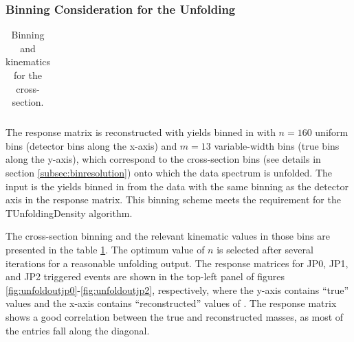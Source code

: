 \subsubsection{Binning Consideration for the Unfolding}

\begin{table}
    \centering
    \begin{tabular}{cccccc}
    \hline
    
    \end{tabular}
    \caption{Binning and kinematics for the \dipion cross-section.}
    \label{tab:xseckin}
\end{table}

 The response matrix is reconstructed with \dipion yields binned in \minv with $n = 160$ uniform bins (detector bins along the x-axis) and $m = 13$ variable-width bins (true bins along the y-axis), which correspond to the cross-section bins (see details in section \ref{subsec:binresolution}) onto which the data spectrum is unfolded. The input is the \dipion yields binned in \minv from the data with the same binning as the detector axis in the response matrix. This binning scheme meets the requirement for the TUnfoldingDensity algorithm.

 The cross-section binning and the relevant kinematic values in those bins are presented in the table \ref{tab:xseckin}. The optimum value of $n$ is selected after several iterations for a reasonable unfolding output. The response matrices for JP0, JP1, and JP2 triggered events are shown in the top-left panel of figures \ref{fig:unfoldoutjp0}-\ref{fig:unfoldoutjp2}, respectively, where the y-axis contains ``true'' values and the x-axis contains ``reconstructed'' values of \mpair. The response matrix shows a good correlation between the true and reconstructed masses, as most of the entries fall along the diagonal. 

